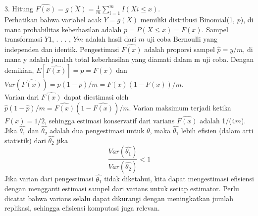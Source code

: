 \documentclass[a4paper,12pt]{article}
\theoremstyle{definition}
\begin{document}
3. Hitung $\widehat{F(x)}=\overline{g(X)}=\frac{1}{m}\sum_{i=1}^{m}I(Xi\leq x).$\\
Perhatikan bahwa variabel acak $Y = g(X)$ memiliki distribusi Binomial(1, $p$), di mana probabilitas keberhasilan adalah $p = P(X \leq x) = F(x).$ Sampel transformasi $Y1$, . . . , $Ym$ adalah hasil dari $m$ uji coba Bernoulli yang independen dan identik. Pengestimasi $\widehat{F(x)}$ adalah proporsi sampel $\hat{p} = y/m$, di mana y adalah jumlah total keberhasilan yang diamati dalam m uji coba. Dengan demikian, $E[\widehat{F(x)}]=p=F(x)$ dan $Var(\widehat{F(x)})=p(1-p)/m=F(x)(1-F(x))/m$.\\
Varian dari $\widehat{F(x)}$ dapat diestimasi oleh $\hat{p}(1-\hat{p})/m =\widehat{F(x)}(1-\widehat{F(x)})/m$. Varian maksimum terjadi ketika $F(x) = 1/2$, sehingga estimasi konservatif dari varians $\widehat{F(x)}$ adalah 1/(4$m$).\\
Jika $\hat{\theta_1}$ dan $\hat{\theta_2}$ adalah dua pengestimasi untuk $\theta$, maka $\hat{\theta_1}$ lebih efisien (dalam arti statistik) dari $\hat{\theta_2}$ jika\\
\begin{equation}
    \frac{Var(\hat{\theta_1})}{Var(\hat{\theta_2})}< 1
\end{equation}
Jika varian dari pengestimasi $\hat{\theta_1}$ tidak diketahui, kita dapat mengestimasi efisiensi dengan mengganti estimasi sampel dari varians untuk setiap estimator. Perlu dicatat bahwa varians selalu dapat dikurangi dengan meningkatkan jumlah replikasi, sehingga efisiensi komputasi juga relevan.
\end{document}
